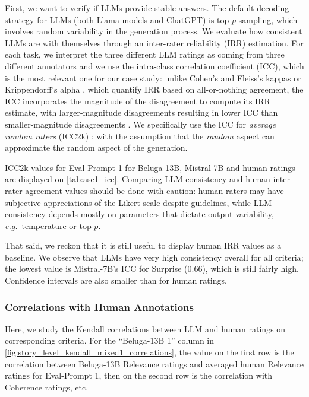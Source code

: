 First, we want to verify if LLMs provide stable answers. The default decoding strategy for LLMs (both Llama models and ChatGPT) is top-$p$ sampling, which involves random variability in the generation process. We evaluate how consistent LLMs are with themselves through an inter-rater reliability (IRR) estimation. For each task, we interpret the three different LLM ratings as coming from three different annotators and we use the intra-class correlation coefficient (ICC), which is the most relevant one for our case study: unlike Cohen's and Fleiss's kappas \citep{cohen1960coefficient, fleiss1971measuring} or Krippendorff's alpha \citep{hayes2007answering}, which quantify IRR based on all-or-nothing agreement, the ICC incorporates the magnitude of the disagreement to compute its IRR estimate, with larger-magnitude disagreements resulting in lower ICC than smaller-magnitude disagreements \citep{hallgren2012computing}. We specifically use the ICC for \emph{average random raters} (ICC2k) \citep{vallat2018pingouin}; with the assumption that the \emph{random} aspect can approximate the random aspect of the generation.

ICC2k values for Eval-Prompt 1 for Beluga-13B, Mistral-7B and human ratings are displayed on \autoref{tab:ase1_icc}. Comparing LLM consistency and human inter-rater agreement values should be done with caution: human raters may have subjective appreciations of the Likert scale despite guidelines, while LLM consistency depends mostly on parameters that dictate output variability, \textit{e.g.}\ temperature or top-$p$.

That said, we reckon that it is still useful to display human IRR values as a baseline. We observe that LLMs have very high consistency overall for all criteria; the lowest value is Mistral-7B's ICC for Surprise (0.66), which is still fairly high. Confidence intervals are also smaller than for human ratings.

\subsubsection{Correlations with Human Annotations}
\label{ssub:ase1_correlations}

Here, we study the Kendall correlations between LLM and human ratings on corresponding criteria. For the ``Beluga-13B 1'' column in \autoref{fig:story_level_kendall_mixed1_correlations}, the value on the first row is the correlation between Beluga-13B Relevance ratings and averaged human Relevance ratings for Eval-Prompt 1, then on the second row is the correlation with Coherence ratings, etc.

